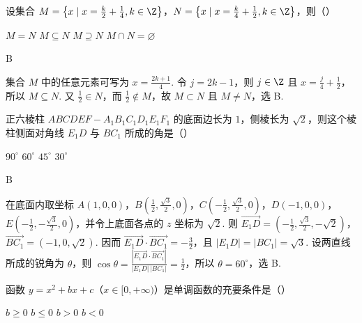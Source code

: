 \begin{problem}
设集合 \(M = \left\{x \mid x = \frac{k}{2} + \frac{1}{4}, k \in \Z\right\}\)，\(N = \left\{x \mid x = \frac{k}{4} + \frac{1}{2}, k \in \Z\right\}\)，则（\quad）

\choices
    {\(M = N\)}
    {\(M \subseteq N\)}
    {\(M \supseteq N\)}
    {\(M \cap N = \varnothing\)}
\end{problem}

\begin{answer}
B
\end{answer}

\begin{solution}
集合 \(M\) 中的任意元素可写为 \(x=\frac{2k+1}{4}\). 令 \(j=2k-1\)，则 \(j\in\Z\) 且 \(x=\frac{j}{4}+\frac{1}{2}\)，所以 \(M\subseteq N\). 又 \(\frac{1}{2}\in N\)，而 \(\frac{1}{2}\notin M\)，故 \(M\subset N\) 且 \(M\ne N\)，选 B.
\end{solution}

\begin{problem}
正六棱柱 \( ABCDEF - A_{1}B_{1}C_{1}D_{1}E_{1}F_{1} \) 的底面边长为 \(1\)，侧棱长为 \(\sqrt{2}\)，则这个棱柱侧面对角线 \(E_{1}D\) 与 \(BC_{1}\) 所成的角是（\quad）

\choices
    {\(90^{\circ}\)}
    {\(60^{\circ}\)}
    {\(45^{\circ}\)}
    {\(30^{\circ}\)}
\end{problem}

\begin{answer}
B
\end{answer}

\begin{solution}
在底面内取坐标 \(A(1,0,0)\)，\(B\left(\frac{1}{2},\frac{\sqrt{3}}{2},0\right)\)，\(C\left(-\frac{1}{2},\frac{\sqrt{3}}{2},0\right)\)，\(D(-1,0,0)\)，\(E\left(-\frac{1}{2},-\frac{\sqrt{3}}{2},0\right)\)，并令上底面各点的 \(z\) 坐标为 \(\sqrt{2}\). 则
\(\overrightarrow{E_{1}D}=\left(-\frac{1}{2},\frac{\sqrt{3}}{2},-\sqrt{2}\right)\)，\(\overrightarrow{BC_{1}}=(-1,0,\sqrt{2})\). 因而 \(\overrightarrow{E_{1}D}\cdot\overrightarrow{BC_{1}}=-\frac{3}{2}\)，且 \(|E_{1}D|=|BC_{1}|=\sqrt{3}\). 设两直线所成的锐角为 \(\theta\)，则
\(\cos\theta=\frac{|\overrightarrow{E_{1}D}\cdot\overrightarrow{BC_{1}}|}{|E_{1}D|\,|BC_{1}|}=\frac{1}{2}\)，所以 \(\theta=60^{\circ}\)，选 B.
\end{solution}

\begin{problem}
函数 \(y = x^{2} + bx + c\)（\(x \in [0, +\infty)\)）是单调函数的充要条件是（\quad）

\choices
    {\(b \geqslant 0\)}
    {\(b \leqslant 0\)}
    {\(b > 0\)}
    {\(b < 0\)}
\end{problem}


